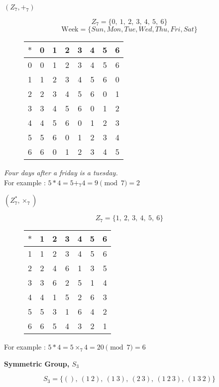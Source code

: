 \documentclass[a6paper,10pt]{book}
\begin{document}
\begin{center}\textbf{$(Z_7,+_7)$}\end{center}
\[ Z_7 = \{ 0,\ 1,\ 2,\ 3,\ 4,\ 5,\ 6 \} \]
\[ \text{Week} = \{ Sun, Mon, Tue, Wed, Thu, Fri, Sat \} \]

\begin{figure}[h]
	\centering
	\begin{tabular}{c|ccccccc}
		$\ast$ & 0 & 1 & 2 & 3 & 4 & 5 & 6 \\ \hline
		0 & 0 & 1 & 2 & 3 & 4 & 5 & 6 \\
		1 & 1 & 2 & 3 & 4 & 5 & 6 & 0 \\
		2 & 2 & 3 & 4 & 5 & 6 & 0 & 1 \\
		3 & 3 & 4 & 5 & 6 & 0 & 1 & 2 \\
		4 & 4 & 5 & 6 & 0 & 1 & 2 & 3 \\
		5 & 5 & 6 & 0 & 1 & 2 & 3 & 4 \\
		6 & 6 & 0 & 1 & 2 & 3 & 4 & 5
	\end{tabular}
\end{figure}

\begin{center}
	\textit{Four days after a friday is a tuesday.}\\
	For example : $ 5 \ast 4 = 5 +_7 4 = 9 \pmod{7} = 2$
\end{center}
\pagebreak

\begin{center} \textbf{$(Z_7^\ast,\times_7)$} \end{center}
\[ Z_7 = \{ 1,\ 2,\ 3,\ 4,\ 5,\ 6 \} \]
\begin{figure}[h]
	\centering
	\begin{tabular}{c|cccccc}
		$\ast$ & 1 & 2 & 3 & 4 & 5 & 6 \\ \hline
		1 & 1 & 2 & 3 & 4 & 5 & 6 \\
		2 & 2 & 4 & 6 & 1 & 3 & 5 \\
		3 & 3 & 6 & 2 & 5 & 1 & 4 \\
		4 & 4 & 1 & 5 & 2 & 6 & 3 \\
		5 & 5 & 3 & 1 & 6 & 4 & 2 \\
		6 & 6 & 5 & 4 & 3 & 2 & 1
	\end{tabular}
\end{figure}

\begin{center}
	For example : $ 5 \ast 4 = 5 \times_7 4 = 20 \pmod{7} = 6$
\end{center}
\pagebreak

\begin{center}\textbf{Symmetric Group, $S_3$}\end{center}
\[S_3 = \{ (),\ (1\ 2),\ (1\ 3),\ (2\ 3),\ (1\ 2\ 3),\ (1\ 3\ 2) \}\]
\end{document}
